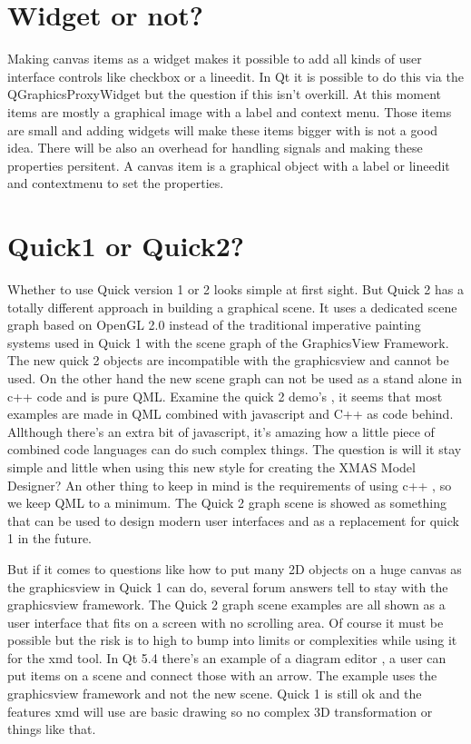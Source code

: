 \documentclass[a4paper,11pt,final]{article}
\begin{document}
\section{Widget or not?}
Making canvas items as a widget makes it possible to add all kinds of user interface controls like checkbox 
or a lineedit. In Qt it is possible to do this via the QGraphicsProxyWidget but the question if this isn't overkill.
At this moment items are mostly a graphical image with a label and context menu. Those items are 
small and adding widgets will make these items bigger with is not a good idea. There will be also
an overhead for handling signals and making these properties persitent.
A canvas item is a graphical object with a label or lineedit and contextmenu to set the properties.

\section{Quick1 or Quick2?}
Whether to use Quick version 1 or 2 looks simple at first sight. But Quick 2 has a totally different approach
in building a graphical scene. It uses a dedicated scene graph based on OpenGL 2.0 instead of the
traditional imperative painting systems used in Quick 1 with the scene graph of the GraphicsView Framework.
The new quick 2 objects are incompatible with the graphicsview and cannot be used. 
On the other hand the new scene graph can not be used as a stand alone in c++ code and is pure
QML. 
Examine the quick 2 demo's , it seems that most examples are made in QML combined with javascript and 
C++ as code behind. Allthough there's an extra bit of javascript, it's amazing how a little piece of 
combined code languages can do such complex things.
The question is will it stay simple and little when using this new style for creating the XMAS Model Designer?
An other thing to keep in mind is the requirements of using c++ , so we keep 
QML to a minimum.
The Quick 2 graph scene is showed as something that can be used to design modern
user interfaces and as a replacement for quick 1 in the future. 

But if it comes to questions like how to put many 2D objects on a huge canvas as the graphicsview in 
Quick 1 can do, several forum answers tell to stay with the graphicsview framework.
The Quick 2 graph scene examples are all shown as a user interface that fits on a screen
with no scrolling area. Of course it must be possible but the risk is to high to bump into
limits or complexities while using it for the xmd tool.
In Qt 5.4 there's an example of a diagram editor , a user can put items on a scene
and connect those with an arrow. The example uses the graphicsview framework and not the 
new scene.
Quick 1 is still ok and the features xmd will use are basic drawing so no complex 3D transformation
or things like that. 
\end{document}
